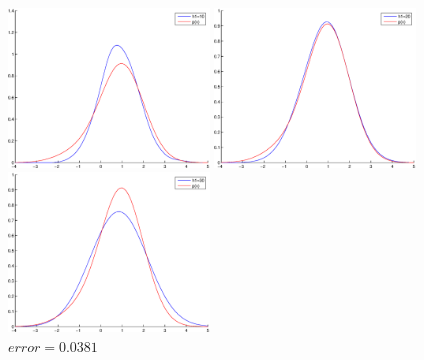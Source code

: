 \documentclass{article}
\theoremstyle{definition}
\theoremstyle{definition}
\theoremstyle{remark}
\begin{document}
\begin{figure}[!htbp]
\begin{minipage}[t]{0.3\linewidth}
\centering
\includegraphics[width=2.1in]{gaussian10.eps}
\caption{$error=0.0561$}
\end{minipage}%
\begin{minipage}[t]{0.3\linewidth}
\centering
\includegraphics[width=2.1in]{gaussian20.eps}
\caption{$error=0.0057$}
\end{minipage}
\begin{minipage}[t]{0.3\linewidth}
\centering
\includegraphics[width=2.1in]{gaussian30.eps}
\caption{$error=0.0381$}
\end{minipage}
\end{figure}



\end{document}
